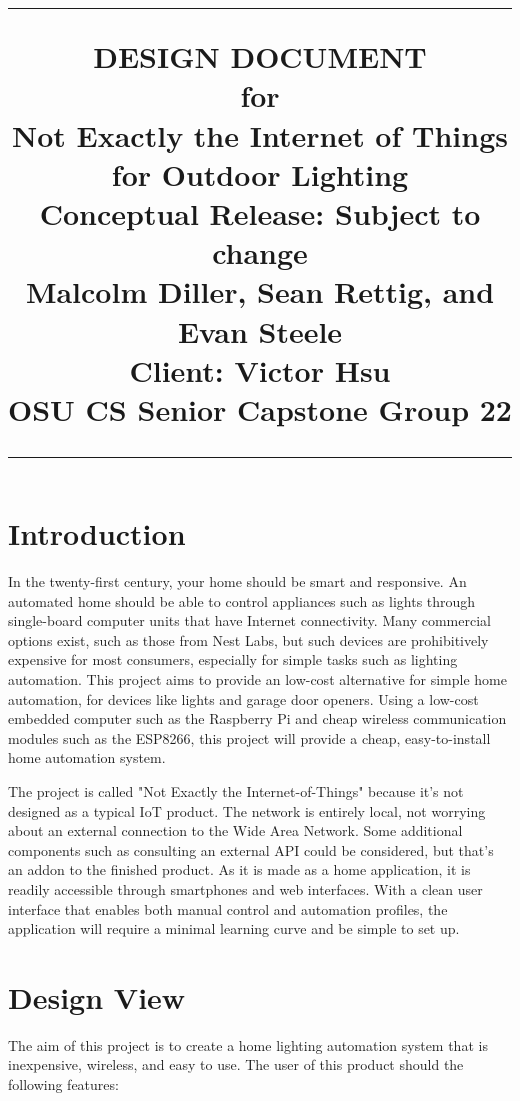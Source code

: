 \documentclass[oneside,openright]{book}
\title{
	\flushright
		\rule{16cm}{5pt}\vskip1cm
		\Huge{DESIGN DOCUMENT}\\
	for\\
		\vspace{2cm}
	Not Exactly the Internet of Things for Outdoor Lighting\\
		\vspace{2cm}
	\LARGE{Conceptual Release:}
	\vspace{2cm}
	\LARGE{Subject to change\\}
	\vspace{2cm}
	Malcolm Diller, Sean Rettig, and Evan Steele\\
        Client: Victor Hsu\\
        OSU CS Senior Capstone Group 22
		\vfill
		\rule{16cm}{5pt}
}
\date{}
\begin{document}
\maketitle
\tableofcontents
\newpage
{} 
\section{Introduction}

In the twenty-first century, your home should be smart and responsive. An
automated home should be able to control appliances such as lights through
single-board computer units that have Internet connectivity. Many commercial
options exist, such as those from Nest Labs, but such devices are prohibitively
expensive for most consumers, especially for simple tasks such as lighting
automation. This project aims to provide an low-cost alternative for simple
home automation, for devices like lights and garage door openers. Using a
low-cost embedded computer such as the Raspberry Pi and cheap wireless
communication modules such as the ESP8266, this project will provide a cheap,
easy-to-install home automation system.

The project is called "Not Exactly the Internet-of-Things" because it's not
designed as a typical IoT product. The network is entirely local, not worrying
about an external connection to the Wide Area Network. Some additional
components such as consulting an external API could be considered, but that's
an addon to the finished product. As it is made as a home application, it is
readily accessible through smartphones and web interfaces. With a clean user
interface that enables both manual control and automation profiles, the
application will require a minimal learning curve and be simple to set up.  

\section{Design View}

The aim of this project is to create a home lighting automation system that is
inexpensive, wireless, and easy to use. The user of this product should the
following features:
\end{document}
